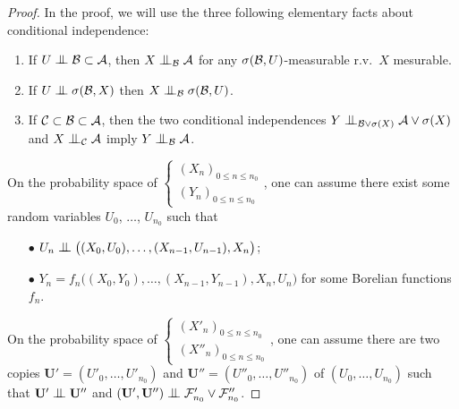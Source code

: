 \documentclass[12pt,a4paper]{article}
\begin{document}
\begin{proof}
In the proof, we will use the three following elementary facts about 
conditional independence:
\begin{enumerate}[{\it(i)}]
\item If $U \indep {\cal B} \subset {\cal A}$, 
then $X \indep_\BB {\cal A}$ for any $\sigma({\cal B}, U)$-measurable r.v.\ $X$ mesurable.

\item If $U \indep \sigma({\cal B}, X)$ then $X \indep_\BB \sigma({\cal B}, U)$.

\item If $\mathcal{C} \subset \mathcal{B} \subset {\cal A}$, then 
the two conditional independences $Y \indep_{\BB \vee \sigma(X)} {\cal A} \vee \sigma(X)$
and $X \indep_{\CC} {\cal A}$ imply $Y \indep_{\BB} {\cal A}$.
\end{enumerate}

On the probability space of $\left\{\begin{smallmatrix} {(X_n)}_{0 \leq n \leq n_0} \\ 
{(Y_n)}_{0 \leq n \leq n_0}
\end{smallmatrix}\right.$, one can assume there exist some random variables 
$U_0$, $\ldots$, $U_{n_0}$ such that 
\begin{itemize}
\item[$\bullet$] $U_n \indep \bigl((X_0,U_0), \ldots, (X_{n-1}, U_{n-1}), X_n\bigr)$;

\item[$\bullet$] $Y_n = f_n\bigl((X_0,Y_0), \ldots, (X_{n-1}, Y_{n-1}), X_n, U_n\bigr)$   
for some Borelian functions $f_n$. 
\end{itemize}


On the probability space of $\left\{\begin{smallmatrix} {(X'_n)}_{0 \leq n \leq n_0} \\ 
{(X''_n)}_{0 \leq n \leq n_0}
\end{smallmatrix}\right.$, one can assume there are two copies 
$\mathbf{U}'=(U'_0, \ldots, U'_{n_0})$ and $\mathbf{U}''=(U''_0, \ldots, U''_{n_0})$ of 
$(U_0, \ldots, U_{n_0})$ such that $\mathbf{U}' \indep \mathbf{U}''$ and 
$(\mathbf{U}',\mathbf{U}'') \indep \FF'_{n_0} \vee \FF''_{n_0}$. 


\end{proof}
\end{document}
